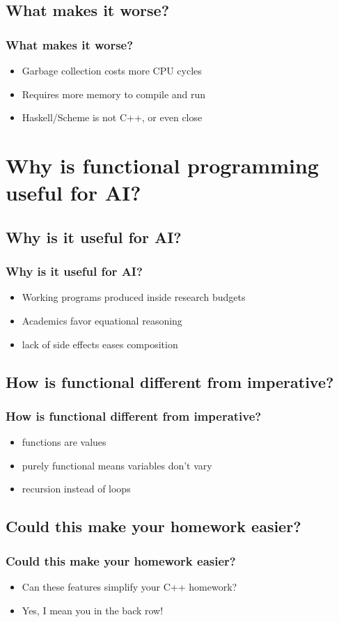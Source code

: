 \documentclass[xcolor=pdftex,dvipsnames,table]{beamer}
\begin{document}
\subsection{What makes it worse?}
\begin{frame}
  \frametitle{What makes it worse?}
  \begin{itemize}
  \item Garbage collection costs more CPU cycles
  \item Requires more memory to compile and run
  \item Haskell/Scheme is not C++, or even close
  \end{itemize}
\end{frame}

\section{Why is functional programming useful for AI?}
\subsection{Why is it useful for AI?}
\begin{frame}
  \frametitle{Why is it useful for AI?}
  \begin{itemize}
  \item Working programs produced inside research budgets
  \item Academics favor equational reasoning
  \item lack of side effects eases composition
  \end{itemize}
\end{frame}

\subsection{How is functional different from imperative?}
\begin{frame}
  \frametitle{How is functional different from imperative?}
  \begin{itemize}
  \item functions are values
  \item purely functional means variables don't vary
  \item recursion instead of loops
  \end{itemize}
\end{frame}

\subsection{Could this make your homework easier?}
\begin{frame}
  \frametitle{Could this make your homework easier?}
  \begin{itemize}
  \item Can these features simplify your C++ homework?
  \item Yes, I mean you in the back row!
  \end{itemize}
\end{frame}
\end{document}
